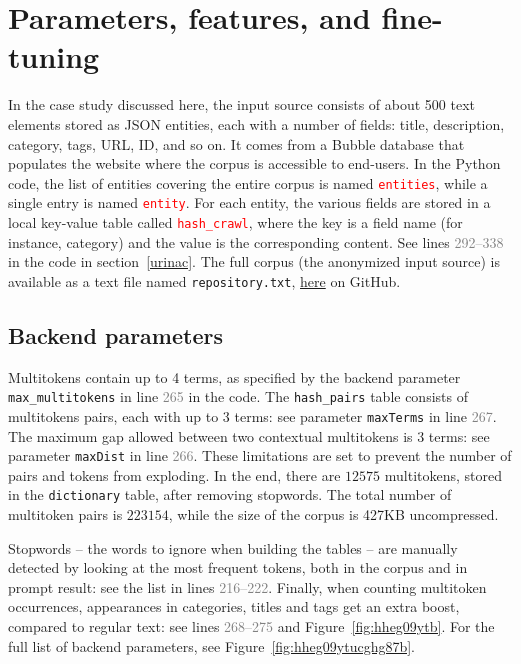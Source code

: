\documentclass[10pt]{article}
\begin{document}
   
\section{Parameters, features, and fine-tuning}\label{cv2se}

In the case study discussed here, the input source consists of about 500 text elements stored as JSON entities, each with a number of fields: 
title, description, category, tags, URL, ID, and so on. It comes from a Bubble database that populates the website where the corpus is accessible to end-users. 
In the Python code, the list of entities covering the entire corpus is named \textcolor{red}{\texttt{entities}}, while a 
single entry is named \textcolor{red}{\texttt{entity}}. For each entity, the various fields are stored in a 
local key-value table called \textcolor{red}{\texttt{hash\_crawl}}, where the key is a field name (for instance, category) and the value is the corresponding content. See lines \textcolor{gray}{292--338} 
in the code in section~\ref{urinac}. The full corpus (the 
anonymized input source)
 is available as a text file named \texttt{repository.txt}, \href{https://github.com/VincentGranville/Large-Language-Models/blob/main/xllm6/enterprise/repository.txt}{here} on GitHub.




\subsection{Backend parameters}

Multitokens contain up to 4 terms, as specified by the backend parameter \texttt{max\_multitokens} in line \textcolor{gray}{265} in the code. 
 The \texttt{hash\_pairs} table consists of multitokens pairs, each with up to 3 terms: see parameter \texttt{maxTerms} in line \textcolor{gray}{267}. 
The maximum gap allowed between two contextual multitokens is 3 terms: see parameter \texttt{maxDist} in line \textcolor{gray}{266}. These limitations
 are set to prevent the number of pairs and tokens from exploding. In the end, there are $\num{12575}$ multitokens, stored in the
 \texttt{dictionary} table, after removing stopwords. The total number of multitoken pairs is $\num{223154}$, while the size of the corpus is 427KB uncompressed.  

Stopwords -- the words to ignore when building the tables --   are manually detected by looking at the most frequent tokens, both in the corpus and in prompt result: see the list in lines \textcolor{gray}{216--222}. Finally, when counting multitoken occurrences, appearances
 in categories, titles and tags get an extra boost, compared to regular text: see lines \textcolor{gray}{268--275} and Figure~\ref{fig:hheg09ytb}.
For the full list of backend parameters, see Figure~\ref{fig:hheg09ytucghg87b}. 
\end{document}
